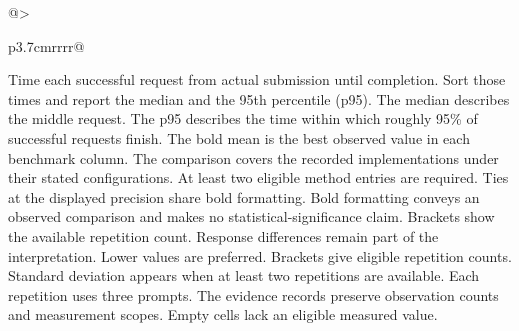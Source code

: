 \begin{table}[!htp]
\begin{tabular}{@{}>{\raggedright\arraybackslash}p{3.7cm}rrrr@{}}
\bottomrule
\end{tabular}\par\medskip
\begin{minipage}{\linewidth}\footnotesize
Time each successful request from actual submission until completion. Sort those times and report the median and the 95th percentile (p95). The median describes the middle request. The p95 describes the time within which roughly 95\% of successful requests finish.
The bold mean is the best observed value in each benchmark column. The comparison covers the recorded implementations under their stated configurations. At least two eligible method entries are required. Ties at the displayed precision share bold formatting. Bold formatting conveys an observed comparison and makes no statistical-significance claim. Brackets show the available repetition count. Response differences remain part of the interpretation. Lower values are preferred.
Brackets give eligible repetition counts. Standard deviation appears when at least two repetitions are available. Each repetition uses three prompts. The evidence records preserve observation counts and measurement scopes. Empty cells lack an eligible measured value.
\end{minipage}
\end{table}

